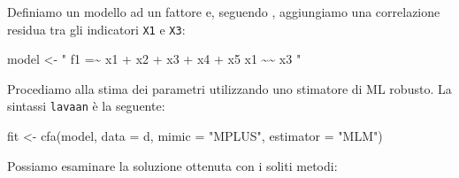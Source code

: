 \documentclass[
  11pt,
]{krantz}
\makeatletter
\newenvironment{Shaded}{\begin{snugshade}}{\end{snugshade}}
\newcommand{\AttributeTok}[1]{\textcolor[rgb]{0.61,0.61,0.61}{#1}}
\newcommand{\FunctionTok}[1]{\textcolor[rgb]{0,0,0}{#1}}
\newcommand{\NormalTok}[1]{#1}
\newcommand{\OtherTok}[1]{\textcolor[rgb]{0.37,0.37,0.37}{#1}}
\newcommand{\StringTok}[1]{\textcolor[rgb]{0.5,0.5,0.5}{#1}}
\newenvironment{kframe}{%
\medskip{}
\setlength{\fboxsep}{.8em}
 \def\at@end@of@kframe{}%
 \ifinner\ifhmode%
  \def\at@end@of@kframe{\end{minipage}}%
  \begin{minipage}{\columnwidth}%
 \fi\fi%
 \def\FrameCommand##1{\hskip\@totalleftmargin \hskip-\fboxsep
 \colorbox{shadecolor}{##1}\hskip-\fboxsep
     \hskip-\linewidth \hskip-\@totalleftmargin \hskip\columnwidth}%
 \MakeFramed {\advance\hsize-\width
   \@totalleftmargin\z@ \linewidth\hsize
   \@setminipage}}%
 {\par\unskip\endMakeFramed%
 \at@end@of@kframe}
\renewenvironment{Shaded}{\begin{kframe}}{\end{kframe}}
\theoremstyle{definition}
\theoremstyle{definition}
\theoremstyle{definition}
\theoremstyle{definition}
\theoremstyle{remark}
\makeatother
\begin{document}
Definiamo un modello ad un fattore e, seguendo \citet{brown2015confirmatory}, aggiungiamo una correlazione residua tra gli indicatori \texttt{X1} e \texttt{X3}:

\begin{Shaded}
\begin{Highlighting}[]
\NormalTok{model }\OtherTok{\textless{}{-}} \StringTok{"}
\StringTok{  f1 =\textasciitilde{} x1 + x2 + x3 + x4 + x5}
\StringTok{  x1 \textasciitilde{}\textasciitilde{} x3}
\StringTok{"}
\end{Highlighting}
\end{Shaded}

Procediamo alla stima dei parametri utilizzando uno stimatore di ML robusto. La sintassi \texttt{lavaan} è la seguente:

\begin{Shaded}
\begin{Highlighting}[]
\NormalTok{fit }\OtherTok{\textless{}{-}} \FunctionTok{cfa}\NormalTok{(model, }\AttributeTok{data =}\NormalTok{ d, }\AttributeTok{mimic =} \StringTok{"MPLUS"}\NormalTok{, }\AttributeTok{estimator =} \StringTok{"MLM"}\NormalTok{)}
\end{Highlighting}
\end{Shaded}

Possiamo esaminare la soluzione ottenuta con i soliti metodi:
\end{document}
